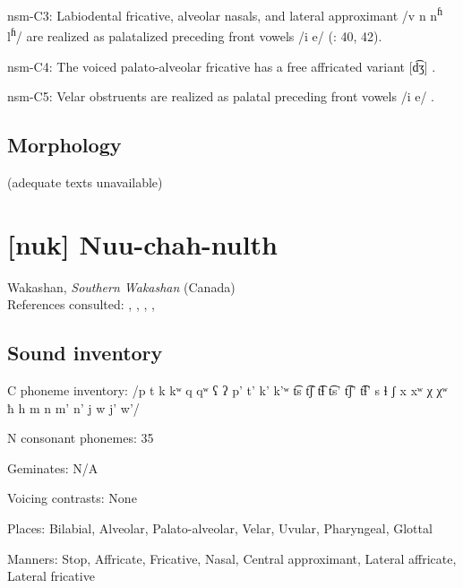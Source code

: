 {\begin{appendixdesc}
\item[nsm-C3:] Labiodental fricative, alveolar nasals, and lateral approximant /v n n\textsuperscript{ɦ} l\textsuperscript{ɦ}/ are realized as palatalized preceding front vowels /i e/ (\citealt{Teo2009}: 40, 42).

\item[nsm-C4:] The voiced palato-alveolar fricative has a free affricated variant [d͡ʒ] \citep[40]{Teo2009}.

\item[nsm-C5:] Velar obstruents are realized as palatal preceding front vowels /i e/ \citep[368]{Teo2012}.
\end{appendixdesc}
\subsection*{Morphology}

(adequate texts unavailable)

\section*{[nuk] Nuu-chah-nulth}   %
Wakashan, \textit{Southern Wakashan} (Canada)\medskip\\
References consulted: \citet{CarlsonEtAl2001}, \citet{Davidson2002}, \citet{Kim2003}, \citet{Rose1981}, \citet{Stonham1999}

\subsection*{Sound inventory}
\begin{appendixdesc}

\item[C phoneme inventory:] /p t k kʷ q qʷ ʕ ʔ p’ t’ k’ k’ʷ t͡s t͡ʃ t͡ɬ t͡s’ t͡ʃ’ t͡ɬ’ s ɬ ʃ x xʷ χ χʷ ħ h m n m’ n’ j w j’ w’/

\item[N consonant phonemes:] 35

\item[Geminates:] N/A

\item[Voicing contrasts:] None

\item[Places:] Bilabial, Alveolar, Palato-alveolar, Velar, Uvular, Pharyngeal, Glottal

\item[Manners:] Stop, Affricate, Fricative, Nasal, Central approximant, Lateral affricate, Lateral fricative


\end{appendixdesc}}
